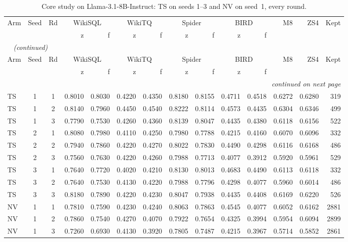 {\small
{}
\setlength{\tabcolsep}{4.2pt}
\begin{longtable}{@{}lccrrrrrrrrrrr@{}}
\caption{Core study on Llama-3.1-8B-Instruct: TS on seeds 1--3 and NV on seed~1, every round.}\label{tab:gen-perseed_core_instruct}\\
\toprule
\rowcolor{headshade}Arm & Seed & Rd & \multicolumn{2}{c}{WikiSQL} & \multicolumn{2}{c}{WikiTQ} & \multicolumn{2}{c}{Spider} & \multicolumn{2}{c}{BIRD} & M8 & ZS4 & Kept\\\rowcolor{headshade} & & & z & f & z & f & z & f & z & f & & &\\
\midrule
\endfirsthead
\multicolumn{14}{l}{\textit{\tablename~\thetable{} (continued)}}\\
\toprule
\rowcolor{headshade}Arm & Seed & Rd & \multicolumn{2}{c}{WikiSQL} & \multicolumn{2}{c}{WikiTQ} & \multicolumn{2}{c}{Spider} & \multicolumn{2}{c}{BIRD} & M8 & ZS4 & Kept\\\rowcolor{headshade} & & & z & f & z & f & z & f & z & f & & &\\
\midrule
\endhead
\midrule
\multicolumn{14}{r}{\textit{continued on next page}}\\
\endfoot
\bottomrule
\endlastfoot
TS & 1 & 1 & 0.8010 & 0.8030 & 0.4220 & 0.4350 & 0.8180 & 0.8155 & 0.4711 & 0.4518 & 0.6272 & 0.6280 & 319\\
TS & 1 & 2 & 0.8140 & 0.7960 & 0.4450 & 0.4540 & 0.8222 & 0.8114 & 0.4573 & 0.4435 & 0.6304 & 0.6346 & 499\\
TS & 1 & 3 & 0.7790 & 0.7530 & 0.4260 & 0.4360 & 0.8139 & 0.8047 & 0.4435 & 0.4380 & 0.6118 & 0.6156 & 522\\
TS & 2 & 1 & 0.8080 & 0.7980 & 0.4110 & 0.4250 & 0.7980 & 0.7788 & 0.4215 & 0.4160 & 0.6070 & 0.6096 & 332\\
TS & 2 & 2 & 0.7940 & 0.7860 & 0.4220 & 0.4270 & 0.8022 & 0.7830 & 0.4490 & 0.4298 & 0.6116 & 0.6168 & 486\\
TS & 2 & 3 & 0.7560 & 0.7630 & 0.4220 & 0.4260 & 0.7988 & 0.7713 & 0.4077 & 0.3912 & 0.5920 & 0.5961 & 529\\
TS & 3 & 1 & 0.7640 & 0.7720 & 0.4020 & 0.4210 & 0.8130 & 0.8013 & 0.4683 & 0.4490 & 0.6113 & 0.6118 & 332\\
TS & 3 & 2 & 0.7640 & 0.7530 & 0.4130 & 0.4220 & 0.7988 & 0.7796 & 0.4298 & 0.4077 & 0.5960 & 0.6014 & 486\\
TS & 3 & 3 & 0.8180 & 0.7890 & 0.4220 & 0.4230 & 0.8047 & 0.7938 & 0.4435 & 0.4408 & 0.6169 & 0.6220 & 526\\
\midrule
NV & 1 & 1 & 0.7810 & 0.7590 & 0.4230 & 0.4240 & 0.8063 & 0.7863 & 0.4545 & 0.4077 & 0.6052 & 0.6162 & 2881\\
NV & 1 & 2 & 0.7860 & 0.7540 & 0.4270 & 0.4070 & 0.7922 & 0.7654 & 0.4325 & 0.3994 & 0.5954 & 0.6094 & 2899\\
NV & 1 & 3 & 0.7260 & 0.6930 & 0.4130 & 0.3920 & 0.7805 & 0.7487 & 0.4215 & 0.3967 & 0.5714 & 0.5852 & 2861\\
\end{longtable}
}
